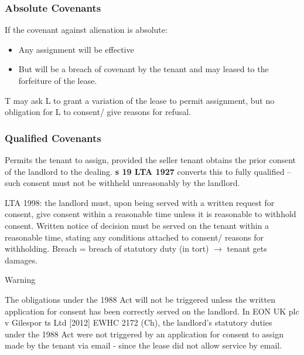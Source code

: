 \documentclass[
]{article}
\providecommand{\tightlist}{%
  \setlength{\itemsep}{0pt}\setlength{\parskip}{0pt}}
\newenvironment{env-1183acc6-7dc8-44d4-a985-6dec306e67fd}
{
    \savenotes\tcolorbox[blanker,breakable,left=5pt,borderline west={2pt}{-4pt}{orange}]
}
{
    \endtcolorbox\spewnotes
}
\begin{document}
\hypertarget{absolute-covenants}{%
\subsubsection{Absolute Covenants}\label{absolute-covenants}}

If the covenant against alienation is absolute:

\begin{itemize}
\tightlist
\item
  Any assignment will be effective
\item
  But will be a breach of covenant by the tenant and may leased to the
  forfeiture of the lease.
\end{itemize}

T may ask L to grant a variation of the lease to permit assignment, but
no obligation for L to consent/ give reasons for refusal.

\hypertarget{qualified-covenants}{%
\subsubsection{Qualified Covenants}\label{qualified-covenants}}

Permits the tenant to assign, provided the seller tenant obtains the
prior consent of the landlord to the dealing. \textbf{s 19 LTA 1927}
converts this to fully qualified -- such consent must not be withheld
unreasonably by the landlord.

LTA 1998: the landlord must, upon being served with a written request
for consent, give consent within a reasonable time unless it is
reasonable to withhold consent. Written notice of decision must be
served on the tenant within a reasonable time, stating any conditions
attached to consent/ reasons for withholding. Breach = breach of
statutory duty (in tort) {\(\rightarrow\)} tenant gets damages.

\begin{env-1183acc6-7dc8-44d4-a985-6dec306e67fd}

Warning

The obligations under the 1988 Act will not be triggered unless the
written application for consent has been correctly served on the
landlord. In EON UK plc v Gilespor ts Ltd {[}2012{]} EWHC 2172 (Ch), the
landlord's statutory duties\\
under the 1988 Act were not triggered by an application for consent to
assign made by the tenant via email - since the lease did not allow
service by email.

\end{env-1183acc6-7dc8-44d4-a985-6dec306e67fd}
\end{document}
